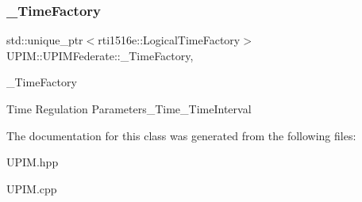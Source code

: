 \subsubsection{\texorpdfstring{\+\_\+\+Time\+Factory}{\_TimeFactory}}
{\footnotesize\ttfamily std\+::unique\+\_\+ptr$<$rti1516e\+::\+Logical\+Time\+Factory$>$ U\+P\+I\+M\+::\+U\+P\+I\+M\+Federate\+::\+\_\+\+Time\+Factory\hspace{0.3cm}{\ttfamily [mutable]}, {\ttfamily [protected]}}



\+\_\+\+Time\+Factory 

Time Regulation Parameters\+\_\+\+Time\+\_\+\+Time\+Interval 

The documentation for this class was generated from the following files\+:\begin{DoxyCompactItemize}
\item 
U\+P\+I\+M.\+hpp\item 
U\+P\+I\+M.\+cpp\end{DoxyCompactItemize}
